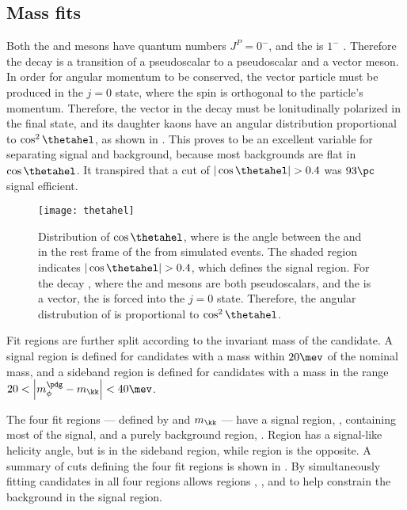 \subsection{Mass fits}
\label{sec:dsphi:fit}
Both the \Bp and \Ds mesons have quantum numbers $J^P=0^-$, and the \phii is $1^-$ .
Therefore the decay \btodsphi is a transition of a pseudoscalar to a pseudoscalar and a vector
meson.
In order for angular momentum to be conserved, the vector particle must be produced in the $j=0$
state, where the spin is orthogonal to the particle's momentum.
Therefore, the vector \phii in the decay \btodsphi must be lonitudinally polarized in the final
state, and its daughter kaons have an angular distribution proportional to $\cos^2\thetahel$, as
shown in .
This proves to be an excellent variable for separating signal and background, because most
backgrounds are flat in $\cos\thetahel$.
It transpired that a cut of $|\cos\thetahel|>0.4$ was $93\pc$ signal efficient.

\begin{figure}
  \begin{center}
    \texttt{[image: thetahel]}
    \caption{\small
      Distribution of $\cos\thetahel$, where \thetahel is the angle between the \Bp and \Kp in the
      rest frame of the \phii from simulated events.
      The shaded region indicates $|\cos\thetahel|>0.4$, which defines the signal region.
      For the decay \btodsphi, where the \Bp and \Ds mesons are both pseudoscalars, and the
      \phii is a vector, the \phii is forced into the $j=0$ state.
      Therefore, the angular distrubution of \thetahel is proportional to $\cos^2\thetahel$.
    }
    \label{fig:dsphi:hel}
  \end{center}
\end{figure}

Fit regions are further split according to the invariant mass of the \phii candidate.
A signal region is defined for \phitokk candidates with a mass within $20\mev$ of the nominal \phii
mass, and a sideband region is defined for candidates with a mass in the range
\mbox{$20<\left|m_\phi^\pdg-m_\kk\right|<40\mev$}.

The four fit regions --- defined by \thetahel and $m_{\kk}$ --- have a signal region, \rA,
containing most of the signal, and a purely background region, \rD.
Region \rB has a signal-like helicity angle, but is in the \phii sideband region, while region \rC
is the opposite.
A summary of cuts defining the four fit regions is shown in .
By simultaneously fitting \btodsphi candidates in all four regions allows regions \rB, \rC, and \rD
to help constrain the background in the signal region.

